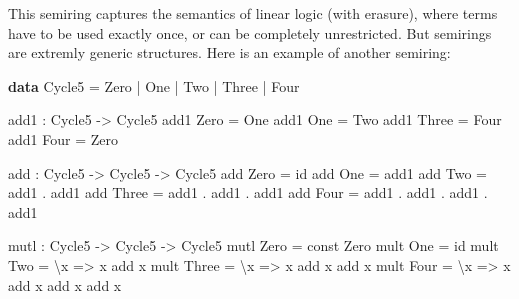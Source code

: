 \documentclass[
]{article}
\newenvironment{Shaded}{}{}
\newcommand{\DataTypeTok}[1]{\textcolor[rgb]{0.56,0.13,0.00}{#1}}
\newcommand{\FunctionTok}[1]{\textcolor[rgb]{0.02,0.16,0.49}{#1}}
\newcommand{\KeywordTok}[1]{\textcolor[rgb]{0.00,0.44,0.13}{\textbf{#1}}}
\newcommand{\NormalTok}[1]{#1}
\newcommand{\OperatorTok}[1]{\textcolor[rgb]{0.40,0.40,0.40}{#1}}
\newcommand{\OtherTok}[1]{\textcolor[rgb]{0.00,0.44,0.13}{#1}}
\begin{document}
This semiring captures the semantics of linear logic (with erasure),
where terms have to be used exactly once, or can be completely
unrestricted. But semirings are extremly generic structures. Here is an
example of another semiring:

\begin{Shaded}
\begin{Highlighting}[]
\KeywordTok{data} \DataTypeTok{Cycle5} \OtherTok{=} \DataTypeTok{Zero} \OperatorTok{|} \DataTypeTok{One} \OperatorTok{|} \DataTypeTok{Two} \OperatorTok{|} \DataTypeTok{Three} \OperatorTok{|} \DataTypeTok{Four}

\NormalTok{add1 }\OperatorTok{:} \DataTypeTok{Cycle5} \OtherTok{{-}\textgreater{}} \DataTypeTok{Cycle5}
\NormalTok{add1 }\DataTypeTok{Zero} \OtherTok{=} \DataTypeTok{One}
\NormalTok{add1 }\DataTypeTok{One} \OtherTok{=} \DataTypeTok{Two}
\NormalTok{add1 }\DataTypeTok{Three} \OtherTok{=} \DataTypeTok{Four}
\NormalTok{add1 }\DataTypeTok{Four} \OtherTok{=} \DataTypeTok{Zero}

\NormalTok{add }\OperatorTok{:} \DataTypeTok{Cycle5} \OtherTok{{-}\textgreater{}} \DataTypeTok{Cycle5} \OtherTok{{-}\textgreater{}} \DataTypeTok{Cycle5}
\NormalTok{add }\DataTypeTok{Zero} \OtherTok{=} \FunctionTok{id}
\NormalTok{add }\DataTypeTok{One} \OtherTok{=}\NormalTok{ add1}
\NormalTok{add }\DataTypeTok{Two} \OtherTok{=}\NormalTok{ add1 }\OperatorTok{.}\NormalTok{ add1}
\NormalTok{add }\DataTypeTok{Three} \OtherTok{=}\NormalTok{ add1 }\OperatorTok{.}\NormalTok{ add1 }\OperatorTok{.}\NormalTok{ add1}
\NormalTok{add }\DataTypeTok{Four} \OtherTok{=}\NormalTok{ add1 }\OperatorTok{.}\NormalTok{ add1 }\OperatorTok{.}\NormalTok{ add1 }\OperatorTok{.}\NormalTok{ add1}

\NormalTok{mutl }\OperatorTok{:} \DataTypeTok{Cycle5} \OtherTok{{-}\textgreater{}} \DataTypeTok{Cycle5} \OtherTok{{-}\textgreater{}} \DataTypeTok{Cycle5}
\NormalTok{mutl }\DataTypeTok{Zero} \OtherTok{=} \FunctionTok{const} \DataTypeTok{Zero}
\NormalTok{mult }\DataTypeTok{One} \OtherTok{=} \FunctionTok{id}
\NormalTok{mult }\DataTypeTok{Two} \OtherTok{=}\NormalTok{ \textbackslash{}x }\OtherTok{=\textgreater{}}\NormalTok{ x }\OtherTok{\textasciigrave{}add\textasciigrave{}}\NormalTok{ x}
\NormalTok{mult }\DataTypeTok{Three} \OtherTok{=}\NormalTok{ \textbackslash{}x }\OtherTok{=\textgreater{}}\NormalTok{ x }\OtherTok{\textasciigrave{}add\textasciigrave{}}\NormalTok{ x }\OtherTok{\textasciigrave{}add\textasciigrave{}}\NormalTok{ x}
\NormalTok{mult }\DataTypeTok{Four} \OtherTok{=}\NormalTok{ \textbackslash{}x }\OtherTok{=\textgreater{}}\NormalTok{ x }\OtherTok{\textasciigrave{}add\textasciigrave{}}\NormalTok{ x }\OtherTok{\textasciigrave{}add\textasciigrave{}}\NormalTok{ x }\OtherTok{\textasciigrave{}add\textasciigrave{}}\NormalTok{ x}
\end{Highlighting}
\end{Shaded}
\end{document}

